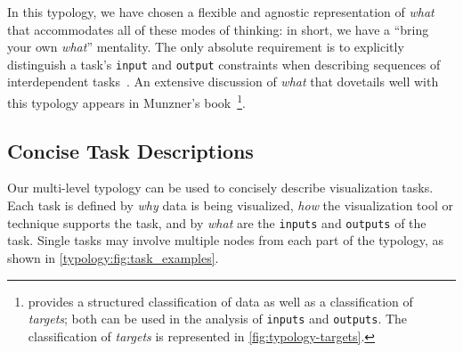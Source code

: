 In this typology, we have chosen a flexible and agnostic representation of {\it what} that accommodates all of these modes of thinking: in short, we have a ``bring your own {\it what}'' mentality.
The only absolute requirement is to explicitly distinguish a task's {\tt input} and {\tt output} constraints when describing sequences of interdependent tasks~\cite{Tweedie1997}.
An extensive discussion of {\it what} that dovetails well with this typology appears in Munzner's book~\cite{Munzner2014}\footnote{\citet{Munzner2014} provides a structured classification of data as well as a classification of {\it targets}; both can be used in the analysis of {\tt inputs} and {\tt outputs}. 
The classification of {\it targets} is represented in \autoref{fig:typology-targets}.}. %



\subsection{Concise Task Descriptions}
\label{typology:task descriptions}


Our multi-level typology can be used to concisely describe visualization tasks.
Each task is defined by {\it why} data is being visualized, {\it how} the visualization tool or technique supports the task, and by {\it what} are the {\tt inputs} and {\tt outputs} of the task.
Single tasks may involve multiple nodes from each part of the typology, as shown in \autoref{typology:fig:task_examples}.


